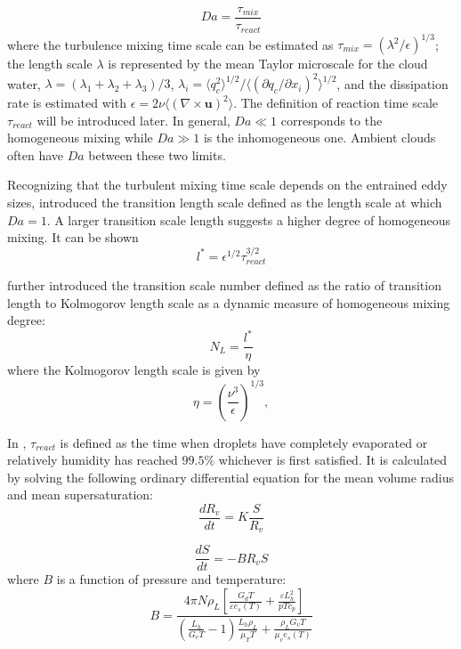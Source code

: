 \begin{equation}
Da=\frac{\tau_{mix}}{\tau_{react}}\label{eq:DaNumber}
\end{equation}
where the turbulence mixing time scale can be estimated as $\tau_{mix} = (\lambda^2/\epsilon)^{1/3}$; the length scale $\lambda$ is represented by the mean Taylor microscale for the cloud water, $\lambda = 
(\lambda_1+\lambda_2+\lambda_3)/3$, $\lambda_i = \langle q_c^2\rangle^{1/2}/\langle(\partial q_c/\partial x_i)^2\rangle^{1/2}$, and the dissipation rate is estimated with $\epsilon = 2\nu\langle(\nabla\times \mathbf{u})^2\rangle$. The definition of reaction time scale $\tau_{react}$ will be introduced later. In general, $Da\ll1$ corresponds to the homogeneous mixing while $Da\gg1$ is
the inhomogeneous one. Ambient clouds often have $Da$ between these two limits.

Recognizing that the turbulent mixing time scale depends on the entrained eddy sizes, 
\cite{Lehmann2009} introduced the transition length scale defined as the length scale at 
which $Da = 1$. A larger transition scale length suggests a higher degree of homogeneous mixing. 
It can be shown
\[
l^{*}=\epsilon^{1/2}\tau_{react}^{3/2}
\]

\cite{Lu2011} further introduced the transition scale number defined as the ratio of 
transition length to Kolmogorov length scale as a dynamic measure of homogeneous mixing degree:
\begin{equation}
N_{L}=\frac{l^{*}}{\eta}\label{eq:NL}
\end{equation}
where the Kolmogorov length scale is given by
\[
\eta = (\frac{\nu^3}{\epsilon})^{1/3}, 
\]


In \cite{Lehmann2009, Lu2013}, $\tau_{react}$ is defined as the time when droplets have completely 
evaporated or relatively humidity has reached $99.5\%$ whichever is first satisfied. It is calculated 
by solving the following ordinary differential equation for the mean volume radius and mean supersaturation:
\begin{equation}
\frac{dR_{v}}{dt}=K\frac{S}{R_{v}}\label{eq:DiffR}
\end{equation}

\begin{equation}
\frac{dS}{dt}=-BR_{v}S\label{eq:DiffSuper}
\end{equation}
where $B$ is a function of pressure and temperature:
\begin{equation}
B = 
\frac{4\pi N\rho_L[\frac{G_dT}{\varepsilon e_s(T)} + \frac{\varepsilon L^2_h}{pTc_p}]} 
{(\frac{L_h}{G_vT}-1)\frac{L_h\rho_L}{\mu_T T} + \frac{\rho_L G_v T}{\mu_v e_s(T)}}
\end{equation}

